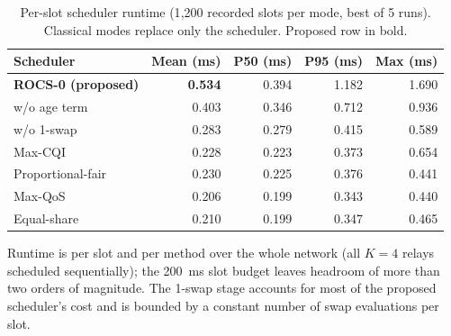 \begin{table}[t]
\centering
\caption{Per-slot scheduler runtime (1{,}200 recorded slots per mode, best of 5 runs). Classical modes replace only the scheduler. Proposed row in bold.}
\label{tab:runtime}
\begin{tabular}{@{}lrrrr@{}}
\toprule
Scheduler & Mean (ms) & P50 (ms) & P95 (ms) & Max (ms) \\
\midrule
\textbf{ROCS-0 (proposed)} & \textbf{0.534} & 0.394 & 1.182 & 1.690 \\
w/o age term & 0.403 & 0.346 & 0.712 & 0.936 \\
w/o 1-swap & 0.283 & 0.279 & 0.415 & 0.589 \\
Max-CQI & 0.228 & 0.223 & 0.373 & 0.654 \\
Proportional-fair & 0.230 & 0.225 & 0.376 & 0.441 \\
Max-QoS & 0.206 & 0.199 & 0.343 & 0.440 \\
Equal-share & 0.210 & 0.199 & 0.347 & 0.465 \\
\bottomrule
\end{tabular}
\begin{flushleft}\footnotesize
Runtime is per slot and per method over the whole network (all $K=4$ relays scheduled sequentially); the 200~ms slot budget leaves headroom of more than two orders of magnitude. The 1-swap stage accounts for most of the proposed scheduler's cost and is bounded by a constant number of swap evaluations per slot.
\end{flushleft}
\end{table}
